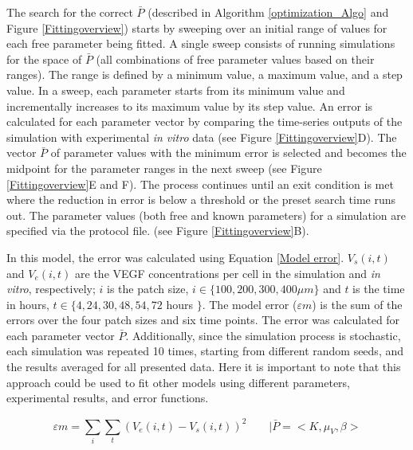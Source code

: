 The search for the correct $\bar{P}$ (described in Algorithm \ref{optimization_Algo} and Figure \ref{Fittingoverview}) starts by sweeping over an initial range of values for each free parameter being fitted. A single sweep consists of running simulations for the space of $\bar{P}$ (all combinations of free parameter values based on their ranges). The range is defined by a minimum value, a maximum value, and a step value. In a sweep, each parameter starts from its minimum value and incrementally increases to its maximum value by its step value. An error is calculated for each parameter vector  by comparing the time-series outputs of the simulation with experimental \textit{in vitro} data (see Figure \ref{Fittingoverview}D). The vector $\bar{P}$ of parameter values with the minimum error is selected and becomes the midpoint for the parameter ranges in the next sweep (see Figure \ref{Fittingoverview}E and F). The process continues until an exit condition is met where the reduction in error is below a threshold or the preset search time runs out. The parameter values (both free and known parameters) for a simulation are specified via the protocol file. (see Figure \ref{Fittingoverview}B).

In this model, the error was calculated using Equation \ref{Model error}. $V_{s}(i,t)$ and $V_{e}(i,t)$ are the VEGF concentrations per cell in the simulation and \textit{in vitro}, respectively; $i$ is the patch size, $i \in \{ 100, 200, 300, 400\mu m \}$ and $t$ is the time in hours, $t \in \{4, 24,30, 48, 54, 72$ hours $\}$. The model error ($\varepsilon m$) is the sum of the errors over the four patch sizes and six time points. The error was calculated for each parameter vector $\bar{P}$. Additionally, since the simulation process is stochastic, each simulation was repeated 10 times, starting from different random seeds, and the results averaged for all presented data. Here it is important to note that this approach could be used to fit other models using different parameters, experimental results, and error functions.





\begin{equation}
 \varepsilon m = \sum_{i} \sum_{t}^{} (V_{e}(i,t)-V_{s}(i,t))^2\quad  \quad  | \bar{P}=<K,\mu _{V},\beta>
\label{Model error}
\end{equation}

